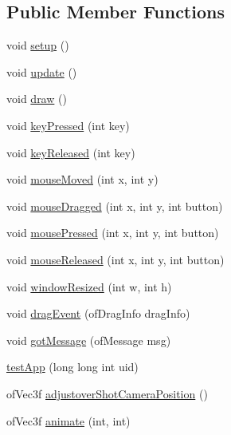\subsection*{Public Member Functions}
\begin{DoxyCompactItemize}
\item 
void \hyperlink{group___openframeworks_defaults_gad431db15b6150b965cd52bcba8e16e11}{setup} ()
\item 
void \hyperlink{group___openframeworks_defaults_gafb39d201aec71a295b7609876bf7d0c6}{update} ()
\item 
void \hyperlink{group___openframeworks_defaults_gaf869cba67b1dab8481f8d0e216d59dcd}{draw} ()
\item 
void \hyperlink{group___openframeworks_defaults_ga904d147c7e532cb92656d5dd4895cd26}{key\-Pressed} (int key)
\item 
void \hyperlink{group___openframeworks_defaults_ga1116a10088e4932f6d482efe723cd45e}{key\-Released} (int key)
\item 
void \hyperlink{group___openframeworks_defaults_ga33541b19eff9f8285b2487bfc146d58b}{mouse\-Moved} (int x, int y)
\item 
void \hyperlink{group___openframeworks_defaults_ga075bcc2be16fd8f3eaa9162fb40a0a1f}{mouse\-Dragged} (int x, int y, int button)
\item 
void \hyperlink{group___openframeworks_defaults_ga3f200702ce91859cac2872a39302679d}{mouse\-Pressed} (int x, int y, int button)
\item 
void \hyperlink{group___openframeworks_defaults_gaa3680ffc782b1e5c451289817f20c9c6}{mouse\-Released} (int x, int y, int button)
\item 
void \hyperlink{group___openframeworks_defaults_ga428b7df9c64352d6e7cb234fc297e6c9}{window\-Resized} (int w, int h)
\item 
void \hyperlink{group___openframeworks_defaults_gaf15e9e9064fe5ccbe6c82cc401ae9e09}{drag\-Event} (of\-Drag\-Info drag\-Info)
\item 
void \hyperlink{group___openframeworks_defaults_ga66dbc8c5c2d4e20febebe9fd42b8c851}{got\-Message} (of\-Message msg)
\item 
\hyperlink{classtest_app_ad4619d5025758886b4de4162c389dc7a}{test\-App} (long long int uid)
\item 
of\-Vec3f \hyperlink{group___camera_animation_ga2a792bfdf269fd69951cbf97d4f574af}{adjustover\-Shot\-Camera\-Position} ()
\item 
of\-Vec3f \hyperlink{group___camera_animation_ga1facfe2200dae7ad147b8f9ab31f68c6}{animate} (int, int)

\end{DoxyCompactItemize}
